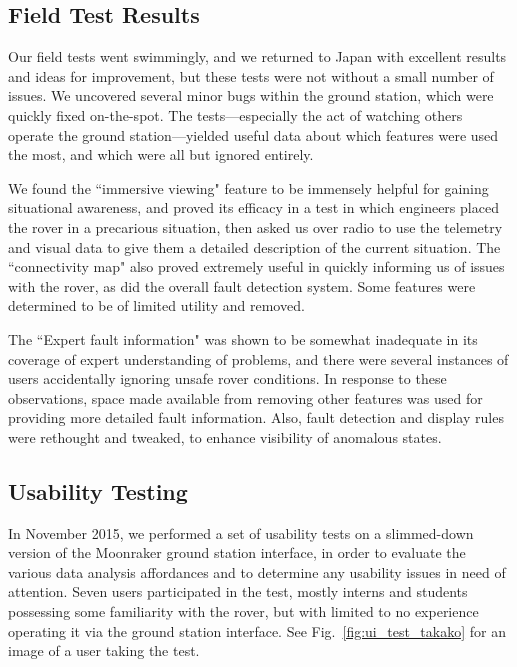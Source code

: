 \subsection{Field Test Results}

Our field tests went swimmingly, and we returned to Japan with excellent results and ideas for improvement, but these tests were not without a small number of issues. We uncovered several minor bugs within the ground station, which were quickly fixed on-the-spot. The tests---especially the act of watching others operate the ground station---yielded useful data about which features were used the most, and which were all but ignored entirely.

We found the ``immersive viewing" feature to be immensely helpful for gaining situational awareness, and proved its efficacy in a test in which engineers placed the rover in a precarious situation, then asked us over radio to use the telemetry and visual data to give them a detailed description of the current situation. The ``connectivity map" also proved extremely useful in quickly informing us of issues with the rover, as did the overall fault detection system. Some features were determined to be of limited utility and removed.

The ``Expert fault information" was shown to be somewhat inadequate in its coverage of expert understanding of problems, and there were several instances of users accidentally ignoring unsafe rover conditions. In response to these observations, space made available from removing other features was used for providing more detailed fault information. Also, fault detection and display rules were rethought and tweaked, to enhance visibility of anomalous states.

\subsection{Usability Testing}

In November 2015, we performed a set of usability tests on a slimmed-down version of the Moonraker ground station interface, in order to evaluate the various data analysis affordances and to determine any usability issues in need of attention. Seven users participated in the test, mostly interns and students possessing some familiarity with the rover, but with limited to no experience operating it via the ground station interface. See Fig.~\ref{fig:ui_test_takako} for an image of a user taking the test.

